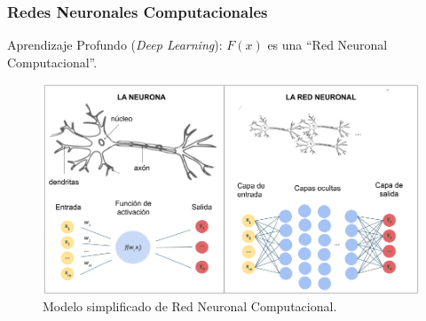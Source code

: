 \documentclass[aspectratio=1610]{beamer}
\begin{document}
\begin{frame}
  \frametitle{Redes Neuronales Computacionales}
  Aprendizaje Profundo (\textit{Deep Learning}): $F(x)$ es una \textquotedblleft Red Neuronal Computacional\textquotedblright.

  \begin{figure}[h]
    \centering
    \includegraphics[scale=0.3]{fig2}
    \caption{Modelo simplificado de Red Neuronal Computacional. }
  \end{figure}

\end{frame}



  

 

\end{document}
